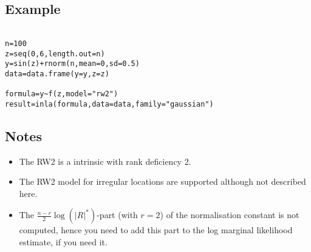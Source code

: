 \documentclass[a4paper,11pt]{article}
\begin{document}
\subsection*{Example}

\begin{verbatim}

n=100
z=seq(0,6,length.out=n)
y=sin(z)+rnorm(n,mean=0,sd=0.5)
data=data.frame(y=y,z=z)

formula=y~f(z,model="rw2")
result=inla(formula,data=data,family="gaussian")
\end{verbatim}


\subsection*{Notes}

\begin{itemize}
\item The RW2 is a intrinsic with rank deficiency 2.
\item The RW2 model for irregular locations are supported although not
    described here.
\item The $\frac{n-r}{2}\log(|R|^{*})$-part (with $r=2$) of the
    normalisation constant is not computed, hence you need to add this
    part to the log marginal likelihood estimate, if you need it.
\end{itemize}
\end{document}
